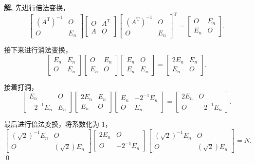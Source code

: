 \documentclass[10pt,openany]{article}
\theoremstyle{thmstyle} %
\theoremstyle{defstyle} %
\theoremstyle{prostyle} %
\theoremstyle{exastyle}
\theoremstyle{remstyle}
\newenvironment{solution}{\par\underline{\textbf{解.}} \;\fangsong}{\qed\par}
\newcommand{\T}{^{\text{T}}}
\begin{document}
\begin{solution}
	先进行倍法变换，
	\[ \begin{bmatrix}
		(A\T)^{-1} & O \\
		O & E_n
	\end{bmatrix}\begin{bmatrix}
	O & A\T \\
	A & O
	\end{bmatrix}\begin{bmatrix}
	(A\T)^{-1} & O \\
	O & E_n
	\end{bmatrix}\T= \begin{bmatrix}
	O & E_n \\
	E_n & O
	\end{bmatrix}. \]
	
	接下来进行消法变换，
	\[ \begin{bmatrix}
		E_n & E_n \\
		O & E_n
	\end{bmatrix}\begin{bmatrix}
	O & E_n \\
	E_n & O
	\end{bmatrix}\begin{bmatrix}
	E_n & O \\
	E_n & E_n
	\end{bmatrix}=\begin{bmatrix}
	2E_n & E_n \\
	E_n & O
	\end{bmatrix}. \]
	
	接着打洞，
	\[ \begin{bmatrix}
		E_n & O \\
		-2^{-1}E_n & E_n
	\end{bmatrix}\begin{bmatrix}
	2E_n & E_n \\
	E_n & O
	\end{bmatrix}\begin{bmatrix}
	E_n & -2^{-1}E_n \\
	O & E_n
	\end{bmatrix}=\begin{bmatrix}
	2E_n & O \\
	O & -2^{-1}E_n
	\end{bmatrix}. \]
	
	最后进行倍法变换，将系数化为 1，
	\[ \begin{bmatrix}
		(\sqrt{2})^{-1} E_n & O \\
		O & (\sqrt{2})E_n 
	\end{bmatrix}\begin{bmatrix}
	2E_n & O \\
	O & -2^{-1}E_n
	\end{bmatrix}\begin{bmatrix}
	(\sqrt{2})^{-1} E_n & O \\
	O & (\sqrt{2})E_n 
	\end{bmatrix}=N. \]
\end{solution}
\end{document}
